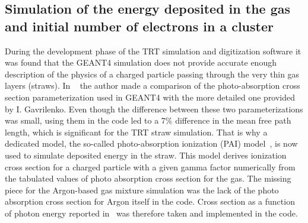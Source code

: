 \subsection{Simulation of the energy deposited in the gas and initial number of electrons in a cluster}
\label{subsec:pai_model}
During the development phase of the TRT simulation and digitization software it was found that the GEANT4 simulation does not provide accurate enough description of the physics
of a charged particle passing through the very thin gas layers (straws). 
In ~\cite{kittelmann_thesis} the author made a comparison of the photo-absorption cross section parameterization used in GEANT4 with the more detailed one provided by I. Gavrilenko.
Even though the difference between these two parameterizations was small, using them in the code led to a 7$\%$ difference in the mean free path length, which is significant for the TRT straw simulation.
That is why a dedicated model, the so-called photo-absorption ionization (PAI) model~\cite{pai_model_paper}, is now used to simulate deposited energy in the straw.
This model derives ionization cross section for a charged particle with a given gamma factor numerically from the tabulated values of photo absorption cross section for the gas.
The missing piece for the Argon-based gas mixture simulation was the lack of the photo absorption cross section for Argon itself in the code.
Cross section as a function of photon energy reported in~\cite{argon_cross_section} was therefore taken and implemented in the code.


